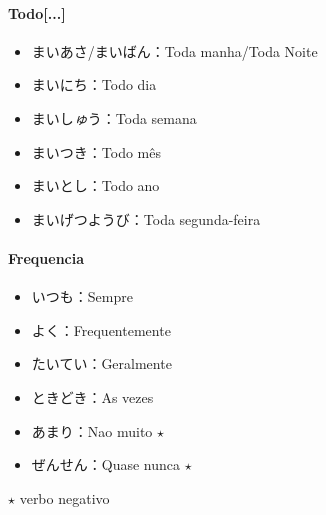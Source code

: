 \documentclass[a4paper, 12pt]{article}
\begin{document}
\paragraph{Todo[...]}
	\begin{CJK}{UTF8}{min}
		\begin{itemize}
			\item まいあさ/まいばん：Toda manha/Toda Noite
			\item まいにち：Todo dia
			\item まいし\textit{ゅ}う：Toda semana
			\item まいつき：Todo mês
			\item まいとし：Todo ano
			\item まいげつようび：Toda segunda-feira
		\end{itemize}
	\end{CJK}

\paragraph{Frequencia}
	\begin{CJK}{UTF8}{min}
		\begin{itemize}
			\item いつも：Sempre
			\item よく：Frequentemente
			\item たいてい：Geralmente
			\item ときどき：As vezes
			\item あまり：Nao muito $ \star $
			\item ぜんせん：Quase nunca $ \star $
		\end{itemize}
	$ \star $ verbo negativo
	\end{CJK}
\end{document}
